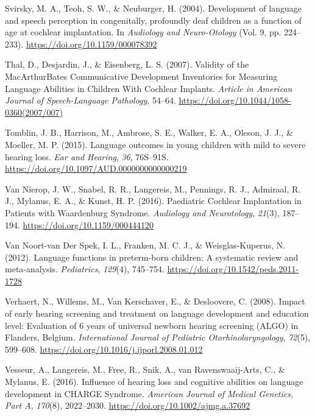 \documentclass[english,man,floatsintext]{apa6}
\begin{document}
\leavevmode\hypertarget{ref-svirsky2004}{}%
Svirsky, M. A., Teoh, S. W., \& Neuburger, H. (2004). Development of language and speech perception in congenitally, profoundly deaf children as a function of age at cochlear implantation. In \emph{Audiology and Neuro-Otology} (Vol. 9, pp. 224--233). \url{https://doi.org/10.1159/000078392}

\leavevmode\hypertarget{ref-thal2007}{}%
Thal, D., Desjardin, J., \& Eisenberg, L. S. (2007). Validity of the MacArthurBates Communicative Development Inventories for Measuring Language Abilities in Children With Cochlear Implants. \emph{Article in American Journal of Speech-Language Pathology}, 54--64. \url{https://doi.org/10.1044/1058-0360(2007/007)}

\leavevmode\hypertarget{ref-tomblin2015}{}%
Tomblin, J. B., Harrison, M., Ambrose, S. E., Walker, E. A., Oleson, J. J., \& Moeller, M. P. (2015). Language outcomes in young children with mild to severe hearing loss. \emph{Ear and Hearing}, \emph{36}, 76S--91S. \url{https://doi.org/10.1097/AUD.0000000000000219}

\leavevmode\hypertarget{ref-vannierop2016}{}%
Van Nierop, J. W., Snabel, R. R., Langereis, M., Pennings, R. J., Admiraal, R. J., Mylanus, E. A., \& Kunst, H. P. (2016). Paediatric Cochlear Implantation in Patients with Waardenburg Syndrome. \emph{Audiology and Neurotology}, \emph{21}(3), 187--194. \url{https://doi.org/10.1159/000444120}

\leavevmode\hypertarget{ref-vannoort-vanderspek2012}{}%
Van Noort-van Der Spek, I. L., Franken, M. C. J., \& Weisglas-Kuperus, N. (2012). Language functions in preterm-born children: A systematic review and meta-analysis. \emph{Pediatrics}, \emph{129}(4), 745--754. \url{https://doi.org/10.1542/peds.2011-1728}

\leavevmode\hypertarget{ref-verhaert2008}{}%
Verhaert, N., Willems, M., Van Kerschaver, E., \& Desloovere, C. (2008). Impact of early hearing screening and treatment on language development and education level: Evaluation of 6 years of universal newborn hearing screening (ALGO) in Flanders, Belgium. \emph{International Journal of Pediatric Otorhinolaryngology}, \emph{72}(5), 599--608. \url{https://doi.org/10.1016/j.ijporl.2008.01.012}

\leavevmode\hypertarget{ref-vesseur2016}{}%
Vesseur, A., Langereis, M., Free, R., Snik, A., van Ravenswaaij-Arts, C., \& Mylanus, E. (2016). Influence of hearing loss and cognitive abilities on language development in CHARGE Syndrome. \emph{American Journal of Medical Genetics, Part A}, \emph{170}(8), 2022--2030. \url{https://doi.org/10.1002/ajmg.a.37692}
\end{document}

